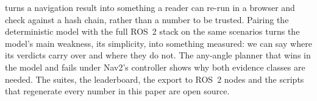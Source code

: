\bench{} turns a navigation result into something a reader can re-run in a browser and check against
a hash chain, rather than a number to be trusted. Pairing the deterministic model with the full ROS~2
stack on the same scenarios turns the model's main weakness, its simplicity, into something measured:
we can say where its verdicts carry over and where they do not. The any-angle planner that wins in the
model and fails under Nav2's controller shows why both evidence classes are needed. The suites, the
leaderboard, the export to ROS~2 nodes and the scripts that regenerate every number in this paper are
open source.
